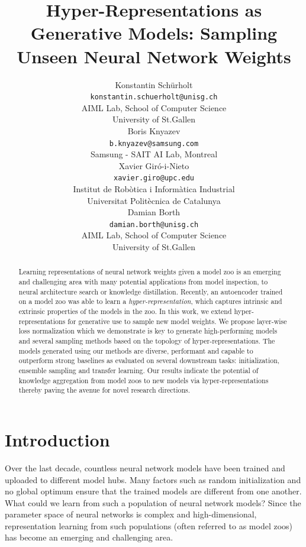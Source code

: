 \documentclass{article}
\title{Hyper-Representations as Generative Models: Sampling Unseen Neural Network Weights}
\author{%
    Konstantin Sch\"urholt \\
    \texttt{konstantin.schuerholt@unisg.ch} \\
    AIML Lab, School of Computer Science\\
    University of St.Gallen\\
    \And
    Boris Knyazev \\
    \texttt{b.knyazev@samsung.com} \\
    Samsung - SAIT AI Lab, Montreal \\
    \AND
    Xavier Giró-i-Nieto \\
    \texttt{xavier.giro@upc.edu} \\
    Institut de Rob\`otica i Inform\`atica Industrial\\
    Universitat Politècnica de Catalunya \\
    \And
    Damian Borth \\ 
    \texttt{damian.borth@unisg.ch} \\
    AIML Lab, School of Computer Science\\
    University of St.Gallen\\
}
\begin{document}
\maketitle

\begin{abstract}
    Learning representations of neural network weights given a model zoo is an emerging and challenging area with many potential applications from model inspection, to  neural architecture search or knowledge distillation.
    Recently, an autoencoder trained on a model zoo was able to learn a \textit{hyper-representation}, which captures intrinsic and extrinsic properties of the models in the zoo.
    In this work, we extend hyper-representations for generative use to sample new model weights.
    We propose layer-wise loss normalization which we demonstrate is key to generate high-performing models and several sampling methods based on the topology of hyper-representations.
    The models generated using our methods are diverse, performant and capable to outperform strong baselines as evaluated on several downstream tasks: initialization, ensemble sampling and transfer learning. 
    Our results indicate the potential of knowledge aggregation from model zoos to new models via hyper-representations thereby paving the avenue for novel research directions.
\end{abstract}



\section{Introduction}
Over the last decade, countless neural network models have been trained and uploaded to different model hubs.
Many factors such as random initialization and no global optimum ensure that the trained models are different from one another.
What could we learn from such a population of neural network models?
Since the parameter space of neural networks is complex and high-dimensional, representation learning from such populations (often referred to as model zoos) has become an emerging and challenging area.
\end{document}
